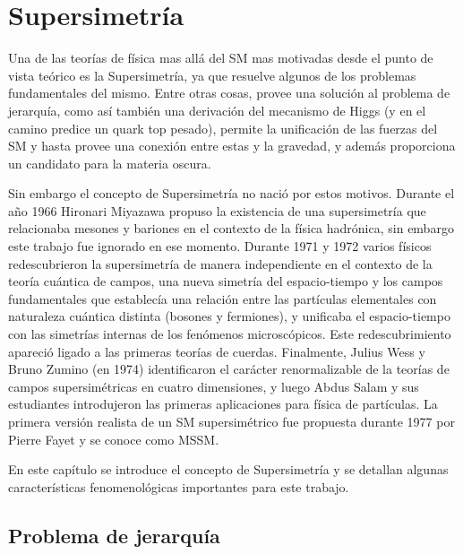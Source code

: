 \chapter{Supersimetría}

Una de las teorías de física mas allá del SM mas motivadas desde el punto de
vista teórico es la Supersimetría, ya que resuelve algunos de los problemas
fundamentales del mismo. Entre otras cosas, provee una solución al problema de
jerarquía, como así también una derivación del mecanismo de Higgs (y en el
camino predice un quark top pesado), permite la unificación de las fuerzas del
SM y hasta provee una conexión entre estas y la gravedad, y además proporciona
un candidato para la materia oscura.

Sin embargo el concepto de Supersimetría no nació por estos motivos. Durante el
a\~no 1966 Hironari Miyazawa propuso la existencia de una supersimetría que
relacionaba mesones y bariones en el contexto de la física hadrónica, sin
embargo este trabajo fue ignorado en ese momento.
Durante 1971 y 1972 varios físicos redescubrieron la supersimetría de manera
independiente en el contexto de la teoría cuántica de campos, una nueva simetría
del espacio-tiempo y los campos fundamentales que establecía una relación entre
las partículas elementales con naturaleza cuántica distinta (bosones y
fermiones), y unificaba el espacio-tiempo con las simetrías internas de los
fenómenos microscópicos. Este redescubrimiento apareció ligado a las primeras
teorías de cuerdas.
Finalmente, Julius Wess y Bruno Zumino (en 1974) identificaron el carácter
renormalizable de la teorías de campos supersimétricas en cuatro dimensiones, y
luego Abdus Salam y sus estudiantes introdujeron las primeras aplicaciones para
física de partículas. La primera versión realista de un SM supersimétrico fue
propuesta durante 1977 por Pierre Fayet y se conoce como MSSM.

En este capítulo se introduce el concepto de Supersimetría y se detallan algunas
características fenomenológicas importantes para este trabajo.


\section{Problema de jerarquía}

